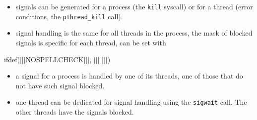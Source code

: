 \begin{slide}
\prgchars
\begin{itemize}
\item signals can be generated for a process (the \texttt{kill} syscall) or
for a thread (error conditions, the \texttt{pthread\_kill} call).
\item signal handling is the same for all threads in the process,
the mask of blocked signals is specific for each thread, can be set with
\end{itemize}
ifdef([[[NOSPELLCHECK]]], [[[
]]])
\begin{itemize}
\item a signal for a process is handled by one of its threads, one of those
that do not have such signal blocked.
\item one thread can be dedicated for signal handling using the
\texttt{sigwait} call. The other threads have the signals blocked.
\end{itemize}
\end{slide}

\label{PTHREADSIGMASK}

